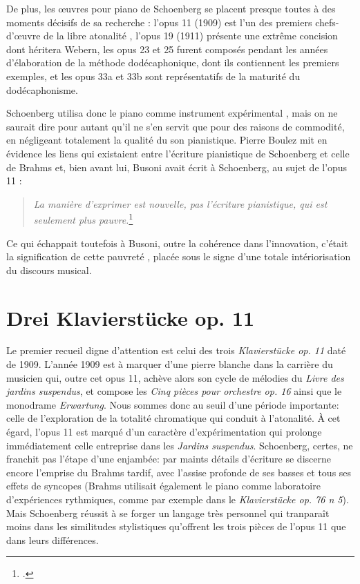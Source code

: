 \documentclass[11pt,a4paper]{scrreprt}
\begin{document}
De plus, les \oe{}uvres pour piano de Schoenberg se placent presque toutes à des moments décisifs de sa recherche : l'opus 11 (1909) est l'un des premiers chefs-d'\oe{}uvre de la \og{} libre atonalité \fg{}, l'opus 19 (1911) présente une extrême concision dont héritera Webern, les opus 23 et 25 furent composés pendant les années d'élaboration de la méthode dodécaphonique, dont ils contiennent les premiers exemples, et les opus 33a et 33b sont représentatifs de la maturité du dodécaphonisme.

Schoenberg utilisa donc le piano comme instrument \og{} expérimental \fg{}, mais on ne saurait dire pour autant qu'il ne s'en servit que pour des raisons de commodité, en négligeant totalement la qualité du son pianistique. Pierre Boulez mit en évidence les liens qui existaient entre l'écriture pianistique de Schoenberg et celle de Brahms et, bien avant lui, Busoni avait écrit à Schoenberg, au sujet de l'opus 11 :
\begin{quote}
\emph{La manière d'exprimer est nouvelle, pas l'écriture pianistique, qui est seulement plus pauvre.}\footcite{szendy2001}
\end{quote}
Ce qui échappait toutefois à Busoni, outre la cohérence dans l'innovation, c'était la signification de cette \og{} pauvreté \fg{}, placée sous le signe d'une totale intériorisation du discours musical.

\section{Drei Klavierstücke op. 11}
Le premier recueil digne d'attention est celui des trois \emph{Klavierstücke op. 11} daté de 1909. L'année 1909 est à marquer d'une pierre blanche dans la carrière du musicien qui, outre cet opus 11, achève alors son cycle de mélodies du \emph{Livre des jardins suspendus}, et compose les \emph{Cinq pièces pour orchestre op. 16} ainsi que le monodrame \emph{Erwartung}. Nous sommes donc au seuil d'une période importante: celle de l'exploration de la totalité chromatique qui conduit à l'atonalité. À cet égard, l'opus 11 est marqué d'un caractère d'expérimentation qui prolonge immédiatement celle entreprise dans les \emph{Jardins suspendus}. Schoenberg, certes, ne franchit pas l'étape d'une enjambée: par maints détails d'écriture se discerne encore l'emprise du Brahms tardif, avec l'assise profonde de ses basses et tous ses effets de syncopes (Brahms utilisait également le piano comme laboratoire d'expériences rythmiques, comme par exemple dans le \emph{Klavierstücke op. 76 n 5}). Mais Schoenberg réussit à se forger un langage très personnel qui tranparaît moins dans les similitudes stylistiques qu'offrent les trois pièces de l'opus 11 que dans leurs différences.
\end{document}
